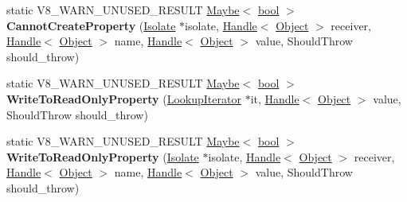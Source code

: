 \begin{DoxyCompactItemize}
\item 
\mbox{\label{classv8_1_1internal_1_1Object_ae9c84534abe89b89a33cbf30d0ac6120}} 
static V8\+\_\+\+W\+A\+R\+N\+\_\+\+U\+N\+U\+S\+E\+D\+\_\+\+R\+E\+S\+U\+LT \mbox{\hyperlink{classv8_1_1Maybe}{Maybe}}$<$ \mbox{\hyperlink{classbool}{bool}} $>$ {\bfseries Cannot\+Create\+Property} (\mbox{\hyperlink{classv8_1_1internal_1_1Isolate}{Isolate}} $\ast$isolate, \mbox{\hyperlink{classv8_1_1internal_1_1Handle}{Handle}}$<$ \mbox{\hyperlink{classv8_1_1internal_1_1Object}{Object}} $>$ receiver, \mbox{\hyperlink{classv8_1_1internal_1_1Handle}{Handle}}$<$ \mbox{\hyperlink{classv8_1_1internal_1_1Object}{Object}} $>$ name, \mbox{\hyperlink{classv8_1_1internal_1_1Handle}{Handle}}$<$ \mbox{\hyperlink{classv8_1_1internal_1_1Object}{Object}} $>$ value, Should\+Throw should\+\_\+throw)
\item 
\mbox{\label{classv8_1_1internal_1_1Object_a8d3a8657fc2a4729c61eaa29fb365476}} 
static V8\+\_\+\+W\+A\+R\+N\+\_\+\+U\+N\+U\+S\+E\+D\+\_\+\+R\+E\+S\+U\+LT \mbox{\hyperlink{classv8_1_1Maybe}{Maybe}}$<$ \mbox{\hyperlink{classbool}{bool}} $>$ {\bfseries Write\+To\+Read\+Only\+Property} (\mbox{\hyperlink{classv8_1_1internal_1_1LookupIterator}{Lookup\+Iterator}} $\ast$it, \mbox{\hyperlink{classv8_1_1internal_1_1Handle}{Handle}}$<$ \mbox{\hyperlink{classv8_1_1internal_1_1Object}{Object}} $>$ value, Should\+Throw should\+\_\+throw)
\item 
\mbox{\label{classv8_1_1internal_1_1Object_a291d978a09211b8839995f895015d2da}} 
static V8\+\_\+\+W\+A\+R\+N\+\_\+\+U\+N\+U\+S\+E\+D\+\_\+\+R\+E\+S\+U\+LT \mbox{\hyperlink{classv8_1_1Maybe}{Maybe}}$<$ \mbox{\hyperlink{classbool}{bool}} $>$ {\bfseries Write\+To\+Read\+Only\+Property} (\mbox{\hyperlink{classv8_1_1internal_1_1Isolate}{Isolate}} $\ast$isolate, \mbox{\hyperlink{classv8_1_1internal_1_1Handle}{Handle}}$<$ \mbox{\hyperlink{classv8_1_1internal_1_1Object}{Object}} $>$ receiver, \mbox{\hyperlink{classv8_1_1internal_1_1Handle}{Handle}}$<$ \mbox{\hyperlink{classv8_1_1internal_1_1Object}{Object}} $>$ name, \mbox{\hyperlink{classv8_1_1internal_1_1Handle}{Handle}}$<$ \mbox{\hyperlink{classv8_1_1internal_1_1Object}{Object}} $>$ value, Should\+Throw should\+\_\+throw)
\item 
\mbox{\label{classv8_1_1internal_1_1Object_af47e73a2fa0e5ea33bec36669045b5a5}} 

\end{DoxyCompactItemize}
